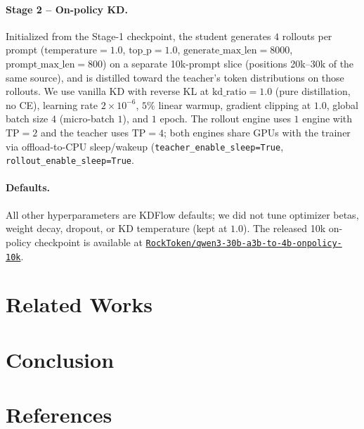 \documentclass{article}
\begin{document}
\paragraph{Stage 2 -- On-policy KD.} Initialized from the Stage-1 checkpoint, the student generates $4$ rollouts per prompt ($\text{temperature}=1.0$, $\text{top\_p}=1.0$, $\text{generate\_max\_len}=8000$, $\text{prompt\_max\_len}=800$) on a separate 10k-prompt slice (positions 20k--30k of the same source), and is distilled toward the teacher's token distributions on those rollouts. We use vanilla KD with reverse KL at $\text{kd\_ratio}=1.0$ (pure distillation, no CE), learning rate $2\times10^{-6}$, $5\%$ linear warmup, gradient clipping at $1.0$, global batch size $4$ (micro-batch $1$), and $1$ epoch. The rollout engine uses $1$ engine with $\text{TP}=2$ and the teacher uses $\text{TP}=4$; both engines share GPUs with the trainer via offload-to-CPU sleep/wakeup (\texttt{teacher\_enable\_sleep=True}, \texttt{rollout\_enable\_sleep=True}.

\paragraph{Defaults.} All other hyperparameters are KDFlow defaults; we did not tune optimizer betas, weight decay, dropout, or KD temperature (kept at $1.0$). The released 10k on-policy checkpoint is available at \href{https://huggingface.co/RockToken/qwen3-30b-a3b-to-4b-onpolicy-10k}{\texttt{RockToken/qwen3-30b-a3b-to-4b-onpolicy-10k}}.



\section{Related Works}




\section{Conclusion}


\section*{References}

{
\small
 

}

\medskip




\end{document}
